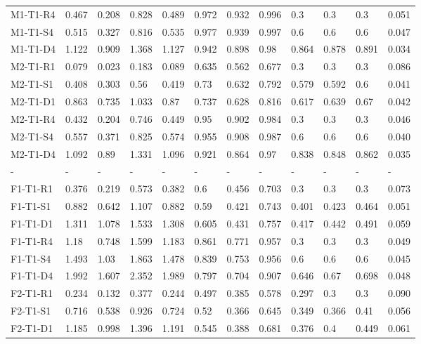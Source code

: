 \begin{table}[ht]
\begin{tabular}{llllllllllll}
  M1-T1-R4 & 0.467 & 0.208 & 0.828 & 0.489 & 0.972 & 0.932 & 0.996 & 0.3 & 0.3 & 0.3 &    0.051  \\ 
  M1-T1-S4 & 0.515 & 0.327 & 0.816 & 0.535 & 0.977 & 0.939 & 0.997 & 0.6 & 0.6 & 0.6 &    0.047  \\ 
  M1-T1-D4 & 1.122 & 0.909 & 1.368 & 1.127 & 0.942 & 0.898 & 0.98 & 0.864 & 0.878 & 0.891 &    0.034  \\ 
  M2-T1-R1 & 0.079 & 0.023 & 0.183 & 0.089 & 0.635 & 0.562 & 0.677 & 0.3 & 0.3 & 0.3 &    0.086  \\ 
  M2-T1-S1 & 0.408 & 0.303 & 0.56 & 0.419 & 0.73 & 0.632 & 0.792 & 0.579 & 0.592 & 0.6 &    0.041  \\ 
  M2-T1-D1 & 0.863 & 0.735 & 1.033 & 0.87 & 0.737 & 0.628 & 0.816 & 0.617 & 0.639 & 0.67 &    0.042  \\ 
  M2-T1-R4 & 0.432 & 0.204 & 0.746 & 0.449 & 0.95 & 0.902 & 0.984 & 0.3 & 0.3 & 0.3 &    0.046  \\ 
  M2-T1-S4 & 0.557 & 0.371 & 0.825 & 0.574 & 0.955 & 0.908 & 0.987 & 0.6 & 0.6 & 0.6 &    0.040  \\ 
  M2-T1-D4 & 1.092 & 0.89 & 1.331 & 1.096 & 0.921 & 0.864 & 0.97 & 0.838 & 0.848 & 0.862 &    0.035  \\ 
  - & - & - & - & - & - & - & - & - & - & - & - \\ 
  F1-T1-R1 & 0.376 & 0.219 & 0.573 & 0.382 & 0.6 & 0.456 & 0.703 & 0.3 & 0.3 & 0.3 &    0.073  \\ 
  F1-T1-S1 & 0.882 & 0.642 & 1.107 & 0.882 & 0.59 & 0.421 & 0.743 & 0.401 & 0.423 & 0.464 &    0.051  \\ 
  F1-T1-D1 & 1.311 & 1.078 & 1.533 & 1.308 & 0.605 & 0.431 & 0.757 & 0.417 & 0.442 & 0.491 &    0.059  \\ 
  F1-T1-R4 & 1.18 & 0.748 & 1.599 & 1.183 & 0.861 & 0.771 & 0.957 & 0.3 & 0.3 & 0.3 &    0.049  \\ 
  F1-T1-S4 & 1.493 & 1.03 & 1.863 & 1.478 & 0.839 & 0.753 & 0.956 & 0.6 & 0.6 & 0.6 &    0.045  \\ 
  F1-T1-D4 & 1.992 & 1.607 & 2.352 & 1.989 & 0.797 & 0.704 & 0.907 & 0.646 & 0.67 & 0.698 &    0.048  \\ 
  F2-T1-R1 & 0.234 & 0.132 & 0.377 & 0.244 & 0.497 & 0.385 & 0.578 & 0.297 & 0.3 & 0.3 &    0.090  \\ 
  F2-T1-S1 & 0.716 & 0.538 & 0.926 & 0.724 & 0.52 & 0.366 & 0.645 & 0.349 & 0.366 & 0.41 &    0.056  \\ 
  F2-T1-D1 & 1.185 & 0.998 & 1.396 & 1.191 & 0.545 & 0.388 & 0.681 & 0.376 & 0.4 & 0.449 &    0.061  \\ 

\end{tabular}
\end{table}
